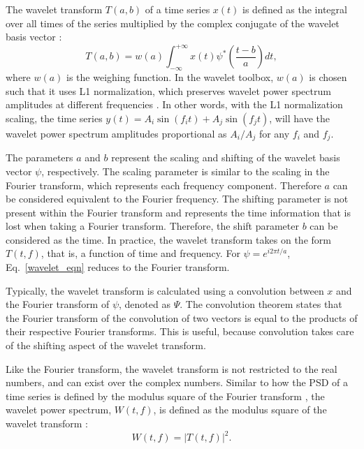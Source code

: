 \documentclass[fleqn,usenatbib]{mnras}
\begin{document}
The wavelet transform $T(a,b)$ of a time series $x(t)$ is defined as the integral over all times of the series multiplied by the complex conjugate of the wavelet basis vector \citep{Addison}:
\begin{equation}
    T(a,b) = w(a)\int_{-\infty}^{+\infty} x(t)\psi^{*}\left( \frac{t - b}{a} \right) dt, \label{wavelet_eqn}
\end{equation}
where $w(a)$ is the weighing function. In the {\sc wavelet toolbox}, $w(a)$ is chosen such that it uses L1 normalization, which preserves wavelet power spectrum amplitudes at different frequencies \citep{misiti1996wavelet}. In other words, with the L1 normalization scaling, the time series $y(t) = A_i \sin (f_i t) + A_j \sin(f_j t)$, will have the wavelet power spectrum amplitudes proportional as $A_i/A_j$ for any $f_i$ and $f_j$.

The parameters $a$ and $b$ represent the scaling and shifting of the wavelet basis vector $\psi$, respectively. The scaling parameter is similar to the scaling in the Fourier transform, which represents each frequency component. Therefore $a$ can be considered equivalent to the Fourier frequency. The shifting parameter is not present within the Fourier transform and represents the time information that is lost when taking a Fourier transform.  Therefore, the shift parameter $b$ can be considered as the time. In practice, the wavelet transform takes on the form $T(t,f)$, that is, a function of time and frequency. For $\psi = e^{i2\pi t/a}$, Eq.~\ref{wavelet_eqn} reduces to the Fourier transform.

Typically, the wavelet transform is calculated using a convolution between $x$ and the Fourier transform of $\psi$, denoted as $\Psi$. The convolution theorem states that the Fourier transform of the convolution of two vectors is equal to the products of their respective Fourier transforms. This is useful, because convolution takes care of the shifting aspect of the wavelet transform.

Like the Fourier transform, the wavelet transform is not restricted to the real numbers, and can exist over the complex numbers. Similar to how the PSD of a time series is defined by the modulus square of the Fourier transform  \citep{uttley2014},  the wavelet power spectrum, $W(t,f)$, is defined as the modulus square of the wavelet transform \citep{torrence1998}:
\begin{equation}
W(t,f) = |T(t,f)|^2.
\end{equation}
\end{document}
